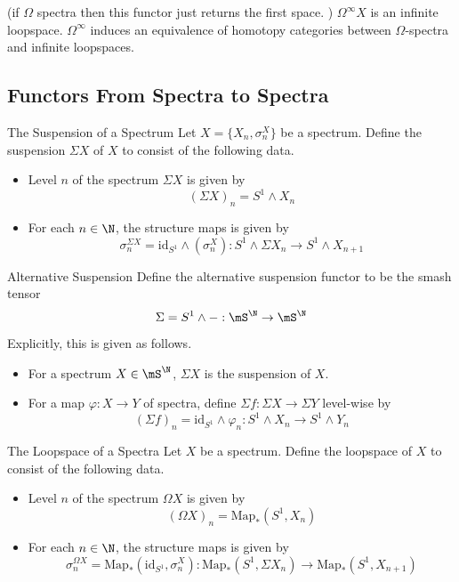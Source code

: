 \documentclass[a4paper]{article}
\begin{document}
(if $\Omega$ spectra then this functor just returns the first space. )
$\Omega^\infty X$ is an infinite loopspace. $\Omega^\infty$ induces an equivalence of homotopy categories between $\Omega$-spectra and infinite loopspaces. 

\subsection{Functors From Spectra to Spectra}
\begin{defn}{The Suspension of a Spectrum}{} Let $X=\{X_n,\sigma_n^X\}$ be a spectrum. Define the suspension $\Sigma X$ of $X$ to consist of the following data. 
\begin{itemize}
\item Level $n$ of the spectrum $\Sigma X$ is given by $$(\Sigma X)_n=S^1\wedge X_n$$
\item For each $n\in\N$, the structure maps is given by $$\sigma_n^{\Sigma X}=\text{id}_{S^1}\wedge(\sigma_n^X):S^1\wedge\Sigma X_n\to S^1\wedge X_{n+1}$$
\end{itemize}
\end{defn}

\begin{defn}{Alternative Suspension}{} Define the alternative suspension functor to be the smash tensor $$\Sigma=S^1\wedge -:\mS^\N\to\mS^\N$$ Explicitly, this is given as follows. 
\begin{itemize}
\item For a spectrum $X\in\mS^\N$, $\Sigma X$ is the suspension of $X$. 
\item For a map $\varphi:X\to Y$ of spectra, define $\Sigma f:\Sigma X\to\Sigma Y$ level-wise by $$(\Sigma f)_n=\text{id}_{S^1}\wedge\varphi_n:S^1\wedge X_n\to S^1\wedge Y_n$$
\end{itemize}
\end{defn}

\begin{defn}{The Loopspace of a Spectra}{} Let $X$ be a spectrum. Define the loopspace of $X$ to consist of the following data.
\begin{itemize}
\item Level $n$ of the spectrum $\Omega X$ is given by $$(\Omega X)_n=\text{Map}_\ast(S^1,X_n)$$
\item For each $n\in\N$, the structure maps is given by $$\sigma_n^{\Omega X}=\text{Map}_\ast(\text{id}_{S^1},\sigma_n^X):\text{Map}_\ast(S^1,\Sigma X_n)\to\text{Map}_\ast(S^1,X_{n+1})$$
\end{itemize}
\end{defn}
\end{document}
